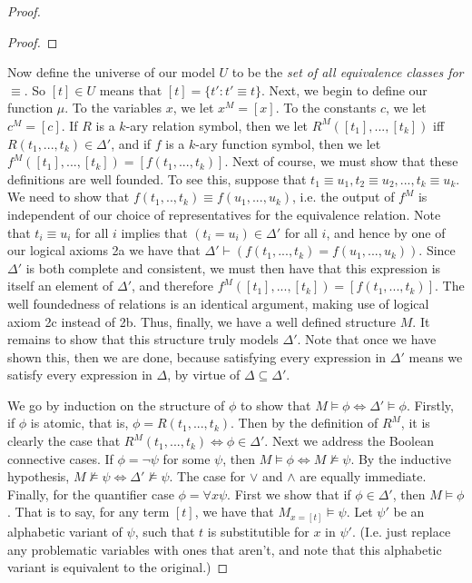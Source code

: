 \begin{proof}
\begin{proof}
    \end{proof}
    Now define the universe of our model $U$ to be the \textit{set of all equivalence classes for $\equiv$}. So $[t] \in U$ means that $[t] = \{t': t' \equiv t\}$. Next, we begin to define our function $\mu$. To the variables $x$, we let $x^M = [x]$. To the constants $c$, we let $c^M = [c]$. If $R$ is a $k$-ary relation symbol, then we let $R^M([t_1],...,[t_k])$ iff $R(t_1,...,t_k) \in \Delta'$, and if $f$ is a $k$-ary function symbol, then we let $f^M([t_1],...,[t_k]) = [f(t_1,...,t_k)]$. Next of course, we must show that these definitions are well founded. To see this, suppose that $t_1 \equiv u_1, t_2 \equiv u_2,..., t_k \equiv u_k$. We need to show that $f(t_1,..,t_k) \equiv f(u_1,...,u_k)$, i.e. the output of $f^M$ is independent of our choice of representatives for the equivalence relation. Note that $t_i \equiv u_i$ for all $i$ implies that $(t_i = u_i) \in \Delta'$ for all $i$, and hence by one of our logical axioms 2a we have that $\Delta' \vdash (f(t_1,...,t_k) = f(u_1,...,u_k))$. Since $\Delta'$ is both complete and consistent, we must then have that this expression is itself an element of $\Delta'$, and therefore $f^M([t_1],...,[t_k]) = [f(t_1,...,t_k)]$. The well foundedness of relations is an identical argument, making use of logical axiom 2c instead of 2b. Thus, finally, we have a well defined structure $M$. It remains to show that this structure truly models $\Delta'$. Note that once we have shown this, then we are done, because satisfying every expression in $\Delta'$ means we satisfy every expression in $\Delta$, by virtue of $\Delta \subseteq \Delta'$.
    \par We go by induction on the structure of $\phi$ to show that $M \models \phi \iff \Delta' \models \phi$. Firstly, if $\phi$ is atomic, that is, $\phi = R(t_1,...,t_k)$. Then by the definition of $R^M$, it is clearly the case that $R^M(t_1,...,t_k) \iff \phi \in \Delta'$. Next we address the Boolean connective cases. 
    If $\phi = \neg \psi$ for some $\psi$, then $M \models \phi \iff M \nvDash \psi$. By the inductive hypothesis, $M \nvDash \psi \iff \Delta' \nvDash \psi$. The case for $\vee$ and $\wedge$ are equally immediate. Finally, for the quantifier case $\phi = \forall x \psi$. First we show that if $\phi \in \Delta'$, then $M \models \phi$. 
    That is to say, for any term $[t]$, we have that $M_{x = [t]} \models \psi$. Let $\psi'$ be an alphabetic variant of $\psi$, such that $t$ is substitutible for $x$ in $\psi'$. (I.e. just replace any problematic variables with ones that aren't, and note that this alphabetic variant is equivalent to the original.) 

\end{proof}
